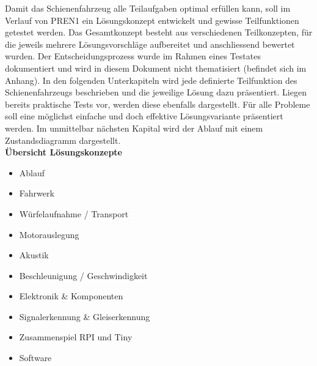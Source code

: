 \documentclass[../../main.tex]{subfiles}
\begin{document}
Damit das Schienenfahrzeug alle Teilaufgaben optimal erfüllen kann, soll im Verlauf von PREN1 ein Lösungskonzept entwickelt und gewisse Teilfunktionen getestet werden. Das Gesamtkonzept besteht aus verschiedenen Teilkonzepten, für die jeweils mehrere Lösungsvorschläge aufbereitet und anschliessend bewertet wurden. Der Entscheidungsprozess wurde im Rahmen eines Testates dokumentiert und wird in diesem Dokument nicht thematisiert (befindet sich im Anhang). In den folgenden Unterkapiteln wird jede definierte Teilfunktion des Schienenfahrzeugs beschrieben und die jeweilige Lösung dazu präsentiert. Liegen bereits praktische Tests vor, werden diese ebenfalls dargestellt. Für alle Probleme soll eine möglichst einfache und doch effektive Lösungsvariante präsentiert werden. Im unmittelbar nächsten Kapital wird der Ablauf mit einem Zustandsdiagramm dargestellt.\\

\textbf{Übersicht Lösungskonzepte}
\begin{itemize}
    \item Ablauf
    \item Fahrwerk
    \item Würfelaufnahme / Transport
    \item Motorauslegung
    \item Akustik
    \item Beschleunigung / Geschwindigkeit
    \item Elektronik \& Komponenten
    \item Signalerkennung \& Gleiserkennung
    \item Zusammenspiel RPI und Tiny
    \item Software
\end{itemize}
\end{document}
